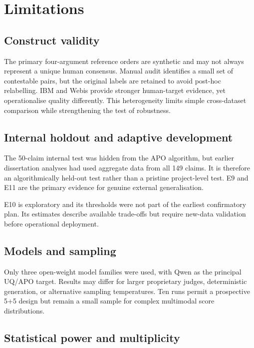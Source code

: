 \documentclass[11pt,twoside,a4paper]{report}
\begin{document}
\section{Limitations}
\label{sec:limitations}

\subsection{Construct validity}

The primary four-argument reference orders are synthetic and may not always represent
a unique human consensus.  Manual audit identifies a small set of contestable pairs,
but the original labels are retained to avoid post-hoc relabelling.  IBM and Webis
provide stronger human-target evidence, yet operationalise quality differently.
This heterogeneity limits simple cross-dataset comparison while strengthening the
test of robustness.

\subsection{Internal holdout and adaptive development}

The 50-claim internal test was hidden from the APO algorithm, but earlier dissertation
analyses had used aggregate data from all 149 claims.  It is therefore an
algorithmically held-out test rather than a pristine project-level test.  E9 and E11
are the primary evidence for genuine external generalisation.

E10 is exploratory and its thresholds were not part of the earliest confirmatory
plan.  Its estimates describe available trade-offs but require new-data validation
before operational deployment.

\subsection{Models and sampling}

Only three open-weight model families were used, with Qwen as the principal UQ/APO
target.  Results may differ for larger proprietary judges, deterministic generation,
or alternative sampling temperatures.  Ten runs permit a prospective 5+5 design but
remain a small sample for complex multimodal score distributions.

\subsection{Statistical power and multiplicity}
\end{document}
